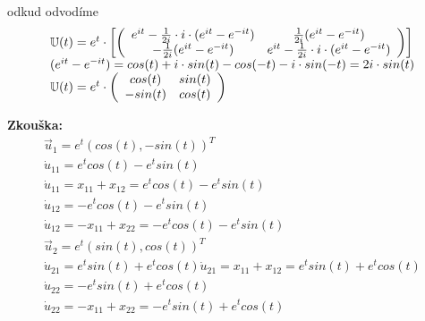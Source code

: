 odkud odvodíme
\begin{equation*}
\begin{array}{l}
  {{\mathbb{U}}}(t) =  e^t\cdot\left[\left( \begin{array}{cc} e^{it}-\frac{1}{2i}\cdot i\cdot (e^{it} - e^{-it}) & \frac{1}{2i}(e^{it} - e^{-it})\\ -\frac{1}{2i}(e^{it} - e^{-it}) & e^{it}-\frac{1}{2i}\cdot i\cdot (e^{it} - e^{-it}) \end{array}\right)\right]\\
  (e^{it} - e^{-it}) = cos(t) + i \cdot sin(t) - cos(-t) - i\cdot sin(-t) = 2i\cdot sin(t)\\
  {{\mathbb{U}}}(t) =  e^t\cdot\left( \begin{array}{cc}cos(t) & sin(t)\\ -sin(t) & cos(t)\end{array}\right)
\end{array}                                                                
\end{equation*}

{\bf Zkouška:}\newline
\begin{equation*}
  \begin{array}{l}
   \vec{u}_{1} = e^{t}(cos(t), -sin(t))^T\\
   \dot{u}_{11} = e^{t}cos(t) - e^{t}sin(t)\\
   \dot{u}_{11} = x_{11} + x_{12} = e^{t}cos(t) - e^{t}sin(t)\\
   \dot{u}_{12} = -e^{t}cos(t) - e^{t}sin(t)\\
   \dot{u}_{12} = -x_{11} + x_{22} = -e^{t}cos(t) - e^{t}sin(t)\\
   \vec{u}_{2} = e^t(sin(t),cos(t))^T\\
   \dot{u}_{21} = e^t sin(t) + e^t cos(t)
   \dot{u}_{21} = x_{11} + x_{12} = e^t sin(t) + e^t cos(t)\\
   \dot{u}_{22} = -e^t sin(t) + e^t cos(t)\\
   \dot{u}_{22} = -x_{11} + x_{22} = -e^t sin(t) + e^t cos(t)
  \end{array}
\end{equation*}

